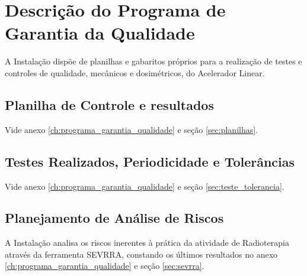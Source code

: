 \chapter{Descrição do Programa de Garantia da Qualidade}
A Instalação dispõe de planilhas e gabaritos próprios para a realização de testes e
controles de qualidade, mecânicos e dosimétricos, do Acelerador Linear.

\section{Planilha de Controle e resultados}
Vide anexo \ref{ch:programa_garantia_qualidade} e seção \ref{sec:planilhas}.

\section{Testes Realizados, Periodicidade e Tolerâncias}
Vide anexo \ref{ch:programa_garantia_qualidade} e seção \ref{sec:teste_tolerancia}.

\section{Planejamento de Análise de Riscos}
A Instalação analisa os riscos inerentes à prática da atividade de Radioterapia através da ferramenta SEVRRA, constando os últimos resultados no anexo \ref{ch:programa_garantia_qualidade} e seção \ref{sec:sevrra}.